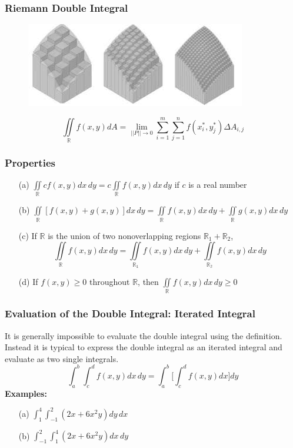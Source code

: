 \documentclass{beamer}
\begin{document}
\begin{frame}
\frametitle{Riemann Double Integral}
\begin{figure}
	\centering
	\includegraphics[width=.95\textwidth]{img_approx.jpg}
	\hspace*{10pt}\hbox{}
\end{figure}
$$\iint\limits_{\mathbb{R}} f(x,y) dA = \lim\limits_{||\mathit{P}||\rightarrow 0} \sum_{i=1}^m \sum_{j=1}^n f(x_i^*,y_j^*)\Delta A_{i,j}$$
\end{frame}

\begin{frame}
\frametitle{Properties}
\begin{itemize}
	\item[(a)] $\iint\limits_{\mathbb{R}} c f(x,y) dx\,dy = c \iint\limits_{\mathbb{R}} f(x,y)dx\,dy$ if $c$ is a real number
	\item[(b)] $\iint\limits_{\mathbb{R}} [f(x,y) + g(x,y)] dx \,dy = \iint\limits_{\mathbb{R}} f(x,y)dx\,dy + \iint\limits_{\mathbb{R}} g(x,y)dx\,dy$
	\item[(c)] If $\mathbb{R}$ is the union of two nonoverlapping regions $\mathbb{R}_1 + \mathbb{R}_2$,
	$$\iint\limits_{\mathbb{R}}f(x,y)dx\,dy = \iint\limits_{\mathbb{R_1}}f(x,y)dx\,dy + \iint\limits_{\mathbb{R_2}}f(x,y)dx\,dy$$
	\item[(d)] If $f(x,y) \geq 0$ throughout $\mathbb{R}$, then $\iint\limits_{\mathbb{R}} f(x,y)dx\,dy \geq 0$
\end{itemize}
\end{frame}

\begin{frame}
\frametitle{Evaluation of the Double Integral: Iterated Integral}
It is generally impossible to evaluate the double integral using the definition. Instead it is typical to express the double integral as an iterated integral and evaluate as two single integrals.
$$\int_a^b \int_c^d f(x,y)dx\,dy = \int_a^b \Bigg[\int_c^d f(x,y)dx\Bigg]dy$$
\vspace{12pt}
\textbf{Examples:}
\begin{itemize}
	\item [(a)] $\int_1^4 \int_{-1}^2 (2x+6x^2y)dy\,dx$
	\item[(b)] $\int_{-1}^2 \int_1^4  (2x+6x^2y)dx\,dy$
\end{itemize}
\end{frame}
\end{document}
